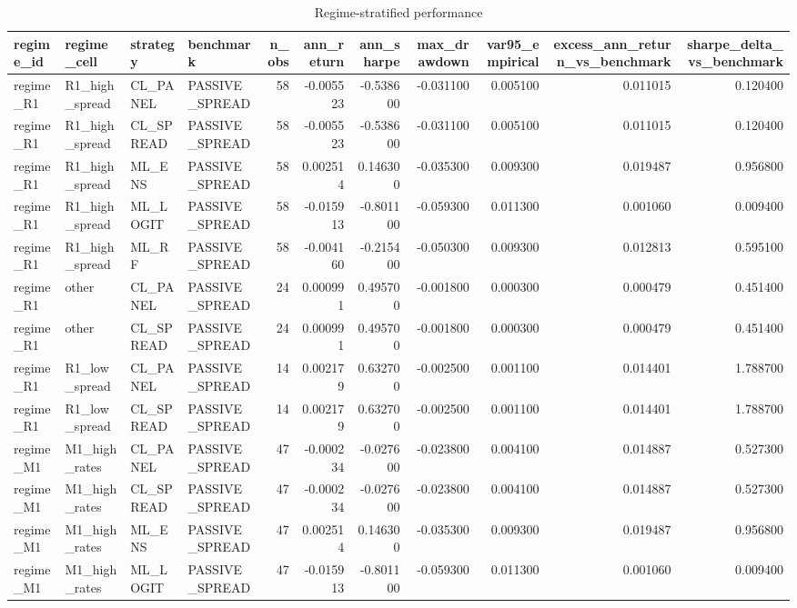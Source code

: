 \begin{table}
\caption{Regime-stratified performance}
\label{tab:7_5}
\begin{tabular}{llllrrrrrrr}
\toprule
regime_id & regime_cell & strategy & benchmark & n_obs & ann_return & ann_sharpe & max_drawdown & var95_empirical & excess_ann_return_vs_benchmark & sharpe_delta_vs_benchmark \\
\midrule
regime_R1 & R1_high_spread & CL_PANEL & PASSIVE_SPREAD & 58 & -0.005523 & -0.538600 & -0.031100 & 0.005100 & 0.011015 & 0.120400 \\
regime_R1 & R1_high_spread & CL_SPREAD & PASSIVE_SPREAD & 58 & -0.005523 & -0.538600 & -0.031100 & 0.005100 & 0.011015 & 0.120400 \\
regime_R1 & R1_high_spread & ML_ENS & PASSIVE_SPREAD & 58 & 0.002514 & 0.146300 & -0.035300 & 0.009300 & 0.019487 & 0.956800 \\
regime_R1 & R1_high_spread & ML_LOGIT & PASSIVE_SPREAD & 58 & -0.015913 & -0.801100 & -0.059300 & 0.011300 & 0.001060 & 0.009400 \\
regime_R1 & R1_high_spread & ML_RF & PASSIVE_SPREAD & 58 & -0.004160 & -0.215400 & -0.050300 & 0.009300 & 0.012813 & 0.595100 \\
regime_R1 & other & CL_PANEL & PASSIVE_SPREAD & 24 & 0.000991 & 0.495700 & -0.001800 & 0.000300 & 0.000479 & 0.451400 \\
regime_R1 & other & CL_SPREAD & PASSIVE_SPREAD & 24 & 0.000991 & 0.495700 & -0.001800 & 0.000300 & 0.000479 & 0.451400 \\
regime_R1 & R1_low_spread & CL_PANEL & PASSIVE_SPREAD & 14 & 0.002179 & 0.632700 & -0.002500 & 0.001100 & 0.014401 & 1.788700 \\
regime_R1 & R1_low_spread & CL_SPREAD & PASSIVE_SPREAD & 14 & 0.002179 & 0.632700 & -0.002500 & 0.001100 & 0.014401 & 1.788700 \\
regime_M1 & M1_high_rates & CL_PANEL & PASSIVE_SPREAD & 47 & -0.000234 & -0.027600 & -0.023800 & 0.004100 & 0.014887 & 0.527300 \\
regime_M1 & M1_high_rates & CL_SPREAD & PASSIVE_SPREAD & 47 & -0.000234 & -0.027600 & -0.023800 & 0.004100 & 0.014887 & 0.527300 \\
regime_M1 & M1_high_rates & ML_ENS & PASSIVE_SPREAD & 47 & 0.002514 & 0.146300 & -0.035300 & 0.009300 & 0.019487 & 0.956800 \\
regime_M1 & M1_high_rates & ML_LOGIT & PASSIVE_SPREAD & 47 & -0.015913 & -0.801100 & -0.059300 & 0.011300 & 0.001060 & 0.009400 \\

\end{tabular}
\end{table}
